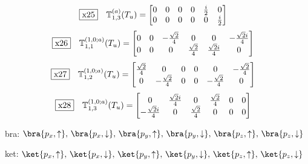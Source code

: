 \documentclass[fleqn,10pt,landscape]{jsarticle}
\begin{document}
\begin{dmath*}
\fbox{x25}\quad \mathbb{T}_{1,3}^{(a)}(T_{u})=\begin{bmatrix} 0 & 0 & 0 & 0 & \frac{i}{2} & 0 \\ 0 & 0 & 0 & 0 & 0 & \frac{i}{2} \end{bmatrix}
\end{dmath*}
\begin{dmath*}
\fbox{x26}\quad \mathbb{T}_{1,1}^{(1,0;a)}(T_{u})=\begin{bmatrix} 0 & 0 & - \frac{\sqrt{2}}{4} & 0 & 0 & - \frac{\sqrt{2} i}{4} \\ 0 & 0 & 0 & \frac{\sqrt{2}}{4} & \frac{\sqrt{2} i}{4} & 0 \end{bmatrix}
\end{dmath*}
\begin{dmath*}
\fbox{x27}\quad \mathbb{T}_{1,2}^{(1,0;a)}(T_{u})=\begin{bmatrix} \frac{\sqrt{2}}{4} & 0 & 0 & 0 & 0 & - \frac{\sqrt{2}}{4} \\ 0 & - \frac{\sqrt{2}}{4} & 0 & 0 & - \frac{\sqrt{2}}{4} & 0 \end{bmatrix}
\end{dmath*}
\begin{dmath*}
\fbox{x28}\quad \mathbb{T}_{1,3}^{(1,0;a)}(T_{u})=\begin{bmatrix} 0 & \frac{\sqrt{2} i}{4} & 0 & \frac{\sqrt{2}}{4} & 0 & 0 \\ - \frac{\sqrt{2} i}{4} & 0 & \frac{\sqrt{2}}{4} & 0 & 0 & 0 \end{bmatrix}
\end{dmath*}
\vspace{5mm}

\noindent\textbullet\, bra: $\bra{p_{x},\uparrow},\, \bra{p_{x},\downarrow},\, \bra{p_{y},\uparrow},\, \bra{p_{y},\downarrow},\, \bra{p_{z},\uparrow},\, \bra{p_{z},\downarrow}$

\noindent\textbullet\, ket: $\ket{p_{x},\uparrow},\, \ket{p_{x},\downarrow},\, \ket{p_{y},\uparrow},\, \ket{p_{y},\downarrow},\, \ket{p_{z},\uparrow},\, \ket{p_{z},\downarrow}$
\end{document}
